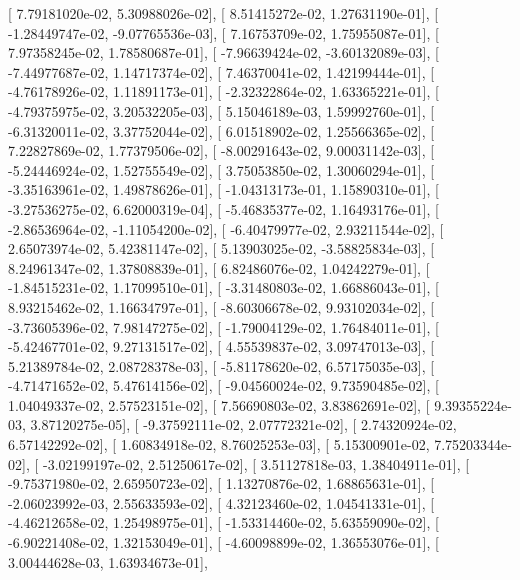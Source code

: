 \documentclass{article}
\begin{document}
       [  7.79181020e-02,   5.30988026e-02],
       [  8.51415272e-02,   1.27631190e-01],
       [ -1.28449747e-02,  -9.07765536e-03],
       [  7.16753709e-02,   1.75955087e-01],
       [  7.97358245e-02,   1.78580687e-01],
       [ -7.96639424e-02,  -3.60132089e-03],
       [ -7.44977687e-02,   1.14717374e-02],
       [  7.46370041e-02,   1.42199444e-01],
       [ -4.76178926e-02,   1.11891173e-01],
       [ -2.32322864e-02,   1.63365221e-01],
       [ -4.79375975e-02,   3.20532205e-03],
       [  5.15046189e-03,   1.59992760e-01],
       [ -6.31320011e-02,   3.37752044e-02],
       [  6.01518902e-02,   1.25566365e-02],
       [  7.22827869e-02,   1.77379506e-02],
       [ -8.00291643e-02,   9.00031142e-03],
       [ -5.24446924e-02,   1.52755549e-02],
       [  3.75053850e-02,   1.30060294e-01],
       [ -3.35163961e-02,   1.49878626e-01],
       [ -1.04313173e-01,   1.15890310e-01],
       [ -3.27536275e-02,   6.62000319e-04],
       [ -5.46835377e-02,   1.16493176e-01],
       [ -2.86536964e-02,  -1.11054200e-02],
       [ -6.40479977e-02,   2.93211544e-02],
       [  2.65073974e-02,   5.42381147e-02],
       [  5.13903025e-02,  -3.58825834e-03],
       [  8.24961347e-02,   1.37808839e-01],
       [  6.82486076e-02,   1.04242279e-01],
       [ -1.84515231e-02,   1.17099510e-01],
       [ -3.31480803e-02,   1.66886043e-01],
       [  8.93215462e-02,   1.16634797e-01],
       [ -8.60306678e-02,   9.93102034e-02],
       [ -3.73605396e-02,   7.98147275e-02],
       [ -1.79004129e-02,   1.76484011e-01],
       [ -5.42467701e-02,   9.27131517e-02],
       [  4.55539837e-02,   3.09747013e-03],
       [  5.21389784e-02,   2.08728378e-03],
       [ -5.81178620e-02,   6.57175035e-03],
       [ -4.71471652e-02,   5.47614156e-02],
       [ -9.04560024e-02,   9.73590485e-02],
       [  1.04049337e-02,   2.57523151e-02],
       [  7.56690803e-02,   3.83862691e-02],
       [  9.39355224e-03,   3.87120275e-05],
       [ -9.37592111e-02,   2.07772321e-02],
       [  2.74320924e-02,   6.57142292e-02],
       [  1.60834918e-02,   8.76025253e-03],
       [  5.15300901e-02,   7.75203344e-02],
       [ -3.02199197e-02,   2.51250617e-02],
       [  3.51127818e-03,   1.38404911e-01],
       [ -9.75371980e-02,   2.65950723e-02],
       [  1.13270876e-02,   1.68865631e-01],
       [ -2.06023992e-03,   2.55633593e-02],
       [  4.32123460e-02,   1.04541331e-01],
       [ -4.46212658e-02,   1.25498975e-01],
       [ -1.53314460e-02,   5.63559090e-02],
       [ -6.90221408e-02,   1.32153049e-01],
       [ -4.60098899e-02,   1.36553076e-01],
       [  3.00444628e-03,   1.63934673e-01],
\end{document}
